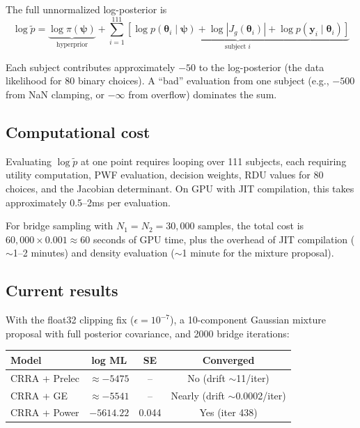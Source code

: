 \documentclass[11pt]{article}
\newcommand{\bth}{\boldsymbol{\theta}}
\newcommand{\bpsi}{\boldsymbol{\psi}}
\newcommand{\by}{\mathbf{y}}
\newcommand{\ptilde}{\tilde{p}}
\theoremstyle{plain}
\theoremstyle{definition}
\begin{document}
The full unnormalized log-posterior is
\begin{equation}
  \log \ptilde = \underbrace{\log \pi(\bpsi)}_{\text{hyperprior}}
  + \sum_{i=1}^{111} \underbrace{\left[
    \log p(\bth_i \mid \bpsi) + \log |J_g(\bth_i)|
    + \log p(\by_i \mid \bth_i)
  \right]}_{\text{subject } i}
\end{equation}

Each subject contributes approximately $-50$ to the log-posterior (the data
likelihood for 80 binary choices). A ``bad'' evaluation from one subject
(e.g., $-500$ from NaN clamping, or $-\infty$ from overflow) dominates
the sum.

\subsection{Computational cost}

Evaluating $\log \ptilde$ at one point requires looping over 111 subjects,
each requiring utility computation, PWF evaluation, decision weights, RDU
values for 80 choices, and the Jacobian determinant. On GPU with JIT
compilation, this takes approximately 0.5--2ms per evaluation.

For bridge sampling with $N_1 = N_2 = 30{,}000$ samples, the total cost is
$60{,}000 \times 0.001 \approx 60$ seconds of GPU time, plus the overhead
of JIT compilation ($\sim$1--2 minutes) and density evaluation
($\sim$1 minute for the mixture proposal).

\subsection{Current results}

With the float32 clipping fix ($\epsilon = 10^{-7}$), a 10-component
Gaussian mixture proposal with full posterior covariance, and 2000 bridge
iterations:

\begin{center}
\begin{tabular}{lccc}
\toprule
Model & log ML & SE & Converged \\
\midrule
CRRA + Prelec & $\approx -5475$ & -- & No (drift $\sim$11/iter) \\
CRRA + GE & $\approx -5541$ & -- & Nearly (drift $\sim$0.0002/iter) \\
CRRA + Power & $-5614.22$ & 0.044 & Yes (iter 438) \\
\bottomrule
\end{tabular}
\end{center}
\end{document}
